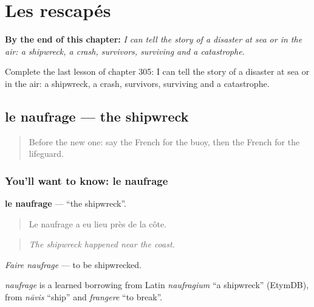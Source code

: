 
\chapter{Les rescapés}
\label{ch:fr-les-rescapes}

\begin{chapteropening}
\textbf{By the end of this chapter:} \emph{I can tell the story of a disaster at sea or in the air: a shipwreck, a crash, survivors, surviving and a catastrophe.}

Complete the last lesson of chapter 305: I can tell the story of a disaster at sea or in the air: a shipwreck, a crash, survivors, surviving and a catastrophe.
\end{chapteropening}

\section[le naufrage]{le naufrage — the shipwreck}

\label{lesson:FR-C305-naufrage}



\begin{quote}
Before the new one: say the French for the buoy, then the French for the lifeguard.
\end{quote}

\subsection*{You'll want to know: le naufrage}
\textbf{le naufrage} — \textquotedblleft{}the shipwreck\textquotedblright{}.

\begin{quote}
Le naufrage a eu lieu près de la côte.
\end{quote}

\begin{quote}
\emph{The shipwreck happened near the coast.}
\end{quote}

\emph{Faire naufrage} — to be shipwrecked.

\begin{cousinweb}
\emph{naufrage} is a learned borrowing from Latin \emph{naufragium} \textquotedblleft{}a shipwreck\textquotedblright{} (EtymDB), from \emph{nāvis} \textquotedblleft{}ship\textquotedblright{} and \emph{frangere} \textquotedblleft{}to break\textquotedblright{}.
\end{cousinweb}

